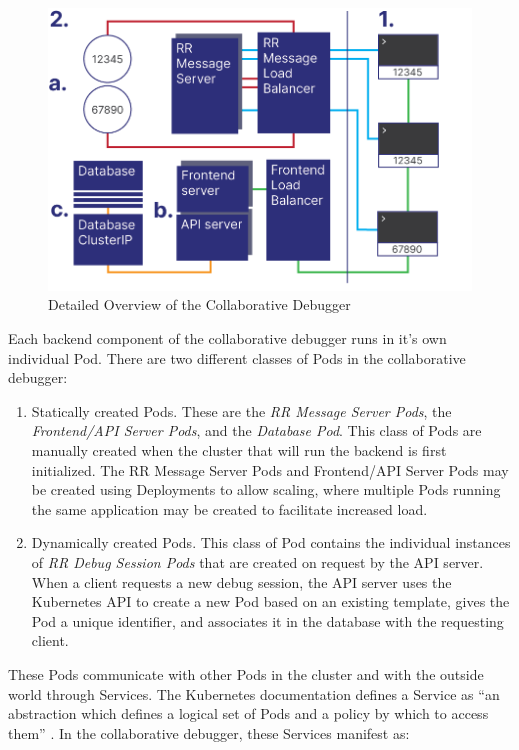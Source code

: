 \documentclass[12pt]{article}
\begin{document}
\begin{figure}[h!]

  \includegraphics[scale=.9]{detailed_system}
  \centering
  \caption{Detailed Overview of the Collaborative Debugger}
  \label{debugger:detailedoverview}
\end{figure}

Each backend component of the collaborative debugger runs in it's own
individual Pod.  There are two different classes of Pods in the
collaborative debugger:

\begin{enumerate}
\item Statically created Pods.  These are the \textit{RR Message
    Server Pods}, the \textit{Frontend/API Server Pods}, and the
  \textit{Database Pod}.  This class of Pods are manually created when
  the cluster that will run the backend is first initialized.  The RR
  Message Server Pods and Frontend/API Server Pods may be created
  using Deployments \cite{k8s_docs} to allow scaling, where multiple
  Pods running the same application may be created to facilitate
  increased load.
\item Dynamically created Pods.  This class of Pod contains the
  individual instances of \textit{RR Debug Session Pods} that are
  created on request by the API server.  When a client requests a new
  debug session, the API server uses the Kubernetes API to create a
  new Pod based on an existing template, gives the Pod a unique
  identifier, and associates it in the database with the requesting
  client.
\end{enumerate}

These Pods communicate with other Pods in the cluster and with the
outside world through Services.  The Kubernetes documentation defines
a Service as ``an abstraction which defines a logical set of Pods and
a policy by which to access them'' \cite{k8s_docs}.  In the
collaborative debugger, these Services manifest as:
\end{document}
